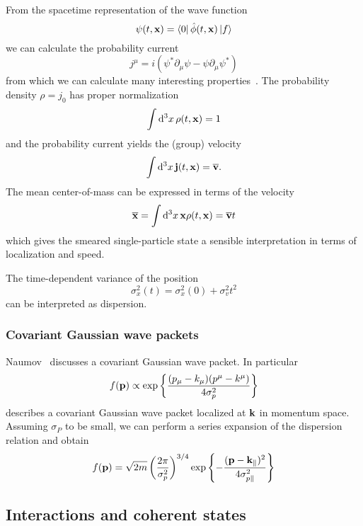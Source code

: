 From the spacetime representation of the wave function
\begin{equation}
	\psi(t,\vb{x})
	=
	\bra{0}\hat\phi(t,\vb{x})\ket{f}
\end{equation}
we can calculate the probability current
\begin{equation}
	j^\mu
	=
	i\left(
		\psi^*\partial_\mu\psi
		-
		\psi\partial_\mu\psi^*
	\right)
	\label{eq:qkg_probability_current}
\end{equation}
from which we can calculate many interesting properties~\cite{Naumov2013}.
The probability density $\rho=j_0$ has proper normalization
\begin{equation}
	\int\dd[3]{x}\rho(t,\vb{x})
	=
	1
\end{equation}
and the probability current yields the (group) velocity
\begin{equation}
	\int\dd[3]{x}\vb{j}(t,\vb{x})
	=
	\overline{\vb{v}}
	\label{qkg:group_velocity}.
\end{equation}
The mean center-of-mass can be expressed in terms of the velocity
\begin{equation}
	\overline{\vb{x}}
	=
	\int\dd[3]{x}\vb{x}\rho(t,\vb{x})
	=
	\overline{\vb{v}}t
	\label{qkg:mean_position}
\end{equation}
which gives the smeared single-particle state a sensible interpretation in terms of localization and speed.

The time-dependent variance of the position
\begin{equation}
	\sigma_x^2(t)
	=
	\sigma_x^2(0)
	+
	\sigma_v^2t^2
\end{equation}
can be interpreted as dispersion.

\subsubsection{Covariant Gaussian wave packets}

Naumov~\cite{Naumov2013} discusses a covariant Gaussian wave packet. In particular
\begin{equation}
	f(\vb{p})
	\propto
	\exp\left\{\frac{(p_\mu-k_\mu)(p^\mu-k^\mu)}{4\sigma_p^2}\right\}
\end{equation}
describes a covariant Gaussian wave packet localized at $\vb{k}$ in momentum space.
Assuming $\sigma_P$ to be small, we can perform a series expansion of the dispersion relation and obtain
\begin{equation}
	f(\vb{p})
	=
	\sqrt{2m}
	\left(\frac{2\pi}{\sigma_p^2}\right)^{3/4}
	\exp\left\{
		-\frac{(\vb{p}-\vb{k}_\parallel)^2}{4\sigma_{p\parallel}^2}
	\right\}
\end{equation}

\subsection{Interactions and coherent states}
